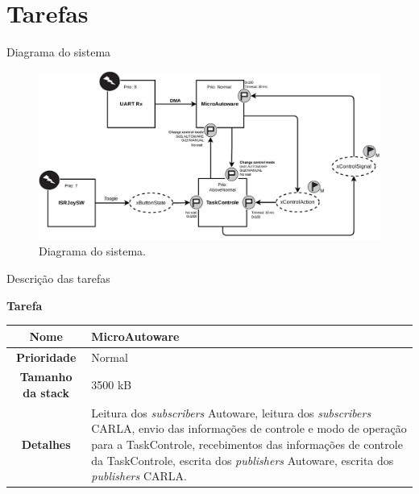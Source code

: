 \documentclass{if-beamer}
\begin{document}
\section{Tarefas}



\begin{frame}{Diagrama do sistema}
	
	\begin{figure}
		\centering
		\includegraphics[width = \textwidth]{img/system_diagram}
		\caption{Diagrama do sistema.}
		\label{fig:systemdiagram}
	\end{figure}
	
\end{frame}

\begin{frame}{Descrição das tarefas}

\begin{block}{\textbf{Tarefa}}
	
	\centering
	
	\begin{tabular}{c|p{8cm}}
		\textbf{Nome} & MicroAutoware \\
		\hline
		\textbf{Prioridade}& Normal \\
		\hline
		\textbf{Tamanho da stack} & 3500 kB \\
		\hline
		\textbf{Detalhes} & Leitura dos \textit{subscribers} Autoware, leitura dos \textit{subscribers} CARLA, envio das informações de controle e modo de operação para a TaskControle, recebimentos das informações de controle da TaskControle, escrita dos \textit{publishers} Autoware, escrita dos \textit{publishers} CARLA. \\
	\end{tabular}
	
\end{block}	

\end{frame}
\end{document}
